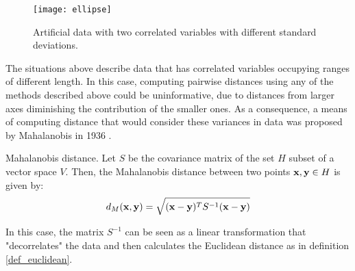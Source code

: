 \documentclass[../main.tex]{subfiles} \label{chapter_soa}
\begin{document}
\begin{figure}[t]
\centering
\texttt{[image: ellipse]}
\caption{Artificial data with two correlated variables with different standard deviations.}
\label{fig_ellipse}
\end{figure}
\par The situations above describe data that has correlated variables occupying ranges of different length. In this case, computing pairwise distances using any of the methods described above could be uninformative, due to distances from larger axes diminishing the contribution of the smaller ones. As a consequence, a means of computing distance that would consider these variances in data was proposed by Mahalanobis in 1936 \cite{Bellet2013}.

\begin{definition}{Mahalanobis distance.} \label{def_mahalanobis}
Let $S$ be the covariance matrix of the set $H$ subset of a vector space $V$. Then, the Mahalanobis distance between two points $\mathbf{x,y}\in H$ is given by:
\begin{align*}
d_{M}(\mathbf{x}, \mathbf{y}) = \sqrt{(\mathbf{x}-\mathbf{y})^TS^{-1}(\mathbf{x}-\mathbf{y})}
\end{align*}
\end{definition}

\par In this case, the matrix $S^{-1}$ can be seen as a linear transformation that "decorrelates" the data and then calculates the Euclidean distance as in definition \ref{def_euclidean}. 
\end{document}

